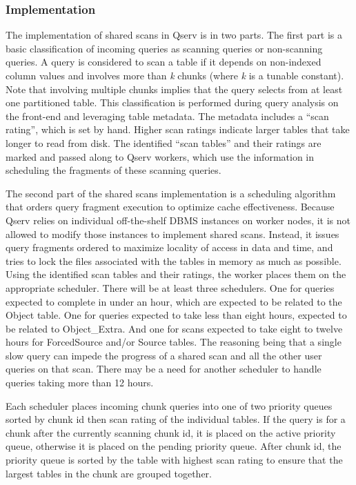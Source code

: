 \documentclass[DM,lsstdraft,toc]{lsstdoc}
\begin{document}
\subsubsection{Implementation}\label{shared-scan-implementation}

The implementation of shared scans in Qserv is in two parts. The first
part is a basic classification of incoming queries as scanning queries
or non-scanning queries. A query is considered to scan a table if it
depends on non-indexed column values and involves more than \emph{k}
chunks (where \emph{k} is a tunable constant). Note that involving
multiple chunks implies that the query selects from at least one
partitioned table. This classification is performed during query
analysis on the front-end and leveraging table metadata. The metadata
includes a ``scan rating'', which is set by hand. Higher scan ratings
indicate larger tables that take longer to read from disk. The
identified ``scan tables'' and their ratings are marked and passed along
to Qserv workers, which use the information in scheduling the fragments
of these scanning queries.

The second part of the shared scans implementation is a scheduling
algorithm that orders query fragment execution to optimize cache
effectiveness. Because Qserv relies on individual off-the-shelf DBMS
instances on worker nodes, it is not allowed to modify those instances
to implement shared scans. Instead, it issues query fragments ordered to
maximize locality of access in data and time, and tries to lock the
files associated with the tables in memory as much as possible. Using
the identified scan tables and their ratings, the worker places them on
the appropriate scheduler. There will be at least three schedulers. One
for queries expected to complete in under an hour, which are expected to
be related to the Object table. One for queries expected to take less
than eight hours, expected to be related to Object\_Extra. And one for
scans expected to take eight to twelve hours for ForcedSource and/or
Source tables. The reasoning being that a single slow query can impede
the progress of a shared scan and all the other user queries on that
scan. There may be a need for another scheduler to handle queries taking
more than 12 hours.

Each scheduler places incoming chunk queries into one of two priority
queues sorted by chunk id then scan rating of the individual tables. If
the query is for a chunk after the currently scanning chunk id, it is
placed on the active priority queue, otherwise it is placed on the
pending priority queue. After chunk id, the priority queue is sorted by
the table with highest scan rating to ensure that the largest tables in
the chunk are grouped together.
\end{document}

